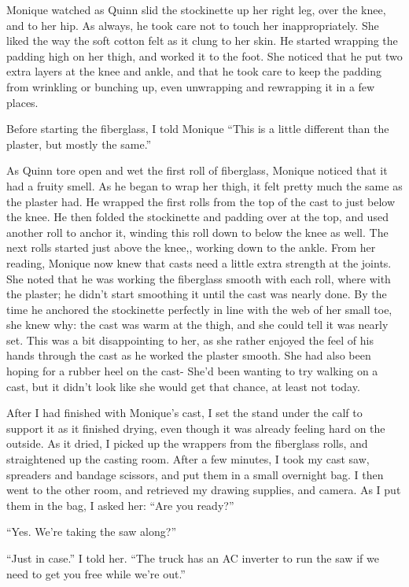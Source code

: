Monique watched as Quinn slid the stockinette up her right leg, over the knee, and to her
hip. As always, he took care not to touch her inappropriately. She liked the way the soft cotton
felt as it clung to her skin. He started wrapping the padding high on her thigh, and worked it
to the foot. She noticed that he put two extra layers at the knee and ankle, and that he took
care to keep the padding from wrinkling or bunching up, even unwrapping and rewrapping it in a
few places.

Before starting the fiberglass, I told Monique ``This is a little different than the
plaster, but mostly the same.''

As Quinn tore open and wet the first roll of fiberglass, Monique noticed that it had a
fruity smell. As he began to wrap her thigh, it felt pretty much the same as the plaster had. He
wrapped the first rolls from the top of the cast to just below the knee. He then folded the
stockinette and padding over at the top, and used another roll to anchor it, winding this roll
down to below the knee as well. The next rolls started just above the knee,, working down to the
ankle. From her reading, Monique now knew that casts need a little extra strength at the joints.
She noted that he was working the fiberglass smooth with each roll, where with the plaster; he
didn't start smoothing it until the cast was nearly done. By the time he anchored the
stockinette perfectly in line with the web of her small toe, she knew why: the cast was warm at
the thigh, and she could tell it was nearly set. This was a bit disappointing to her, as she
rather enjoyed the feel of his hands through the cast as he worked the plaster smooth. She had
also been hoping for a rubber heel on the cast- She'd been wanting to try walking on a cast, but
it didn't look like she would get that chance, at least not today.

After I had finished with Monique's cast, I set the stand under the calf to support it as it
finished drying, even though it was already feeling hard on the outside. As it dried, I picked
up the wrappers from the fiberglass rolls, and straightened up the casting room. After a few
minutes, I took my cast saw, spreaders and bandage scissors, and put them in a small overnight
bag. I then went to the other room, and retrieved my drawing supplies, and camera. As I put them
in the bag, I asked her: ``Are you ready?''

``Yes. We're taking the saw along?''

``Just in case.'' I told her. ``The truck has an AC inverter to run the saw if we need to
get you free while we're out.''

